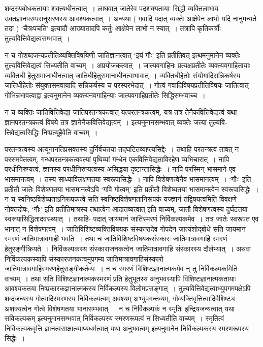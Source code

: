 {शब्दस्यबोधकतायाः शक्त्यधीनत्वात्~। लाघवात् जातेरेव पदशक्यतायाः सिद्धौ व्यक्तिलाभाय उक्तज्ञानपरम्परानुसरणस्य आवश्यकत्वात्~। अन्यथा ( गवादि पदात् व्यक्तेः आक्षेपेन लाभो यदि नानुमन्यते तदा ) ‘चैत्रःपचति’ इत्यादौ आख्यातादपि कर्तुः आक्षेपेन लाभो न स्यात्~। तत्रापि कृतिकर्त्रोः तुल्यवित्तिवेद्यत्वसम्भवात्~। 

न च गोशब्दजन्यप्रतीतिःव्यक्तिविषयिणी जातिज्ञानत्वात् ‘इयं गौः’ इति प्रतीतिवत् इत्थमनुमानेन व्यक्तेः तुल्यवित्तिवेद्यत्वं सिध्यतीति वाच्यम्~। अप्रयोजकत्वात्~।  जात्यवगाहिनः प्रत्यक्षप्रतीतेः व्यक्त्यवगाहितायाः व्यक्तिधी हेतुसमाजाधीनत्वात् जातिधीहेतुसमानाधीनत्वाभावात्~। व्यक्तिधीहेतोः संयोगादिसन्निकर्षस्य जातिधीहेतोः संयुक्तसमवायादि सन्निकर्षस्य च परस्परभेदात्~। गोत्वं गवादिविषयप्रतीतिविषयः जातित्वात् गोभिन्नभावत्वाद्वा इत्यनुमानेन व्यक्त्यनवगाहिन्याः जात्यवगाहिप्रतीतेः सिद्धिसम्भवाच्च~। 

न च व्यक्तिः जातिवित्तिवेद्या जातिपरतन्त्रकत्वात् यत्परतन्त्रकत्वम्, यत्र तत्र तेनैकवित्तिवेद्यत्वं यथा ज्ञानपरतन्त्रकत्वं विषये तत्र ज्ञानेनैकवित्तिवेद्यत्वम्~। इत्यनुमानसम्भवात् व्यक्तेः जत्या तुल्यवि- त्तिवेद्यत्वसिद्धिः निष्प्रत्यूहैवेति वाच्यम्~। 

परतन्त्रत्वस्य अत्यूनानतिप्रसक्तस्य दुर्निर्वचतया तद्घटितव्याप्त्यसिद्देः~। तथाहि परतन्त्रत्वं तावत् न परसमवेतत्वम्, गन्धपरतन्त्रकत्ववत्यां पृथिव्यां गन्धेन एकवित्तिवेद्यताविरहेण व्यभिचारात्~। नापि परधीनिरुप्यत्वं, ज्ञानस्य परधीनिरुप्यत्वस्य असिद्धया दृष्टान्तासिद्धेः~। नापि परस्मिन् भासमाने एव भासमानत्वम्~। तस्य साध्याविलक्षणतया स्वरूपासिद्धेः~। नापि विशेषणत्वेनैव भासमानत्वम्~। ‘गौः’ इति प्रतीतौ जातेः विशेषणतया भासमानत्वेऽपि ‘गवि गोत्वम्’ इति प्रतीतौ विशेष्यतया भासमानत्वेन स्वरूपासिद्धेः~। न च स्वनिष्ठविशेष्यताऽनिरूपकत्वे सति स्वनिष्ठविशेषणतानिरूपकं यज्ज्ञानं तद्विषयत्वमिति विवक्षणे नोक्तदोषः, ‘गौः’ इति प्रतीतिमात्रस्य तथात्वेन आदातव्यत्वात् इति वाच्यम्, जातौ विशेषणत्वस्य दुर्घटतया स्वरूपासिद्धितादवस्थ्यात्~। तथाहि- पदात् जायमानं जातिस्मरणं निर्विकल्पकमेव~। तत्र जातेः स्वरूपत एव भानात् न विशेषणत्वम्~। जातिविशिष्टव्यक्तिविषयक संस्कारादेव गोपदेन जात्यंशोद्बोधे सति जायमानं स्मरणं जातिमात्रावगाही भवति~। तथा च जातिविशिष्टविषयकसंस्कारः जातिमात्रावगाहि स्मरणं हेतुरङ्गीक्रियते~। निर्विकल्पकस्य संस्काराजनकत्वेन जातिमात्रावगाहि संस्कारस्य दौर्लभ्यात्~। अथवा निर्विकल्पकस्यापि संस्कारजनकत्वमुपगम्य जातिमात्रावगाहिसंस्कारो जातिमात्रावगाहिस्मरणहेतुराङ्गीकर्तव्यः~। न च स्मरणं विशिष्टज्ञानात्मकमेव न् तु निर्विकल्पकमिति वाच्यम्~। तथा सति विशिष्टज्ञानात्मकस्मरणं प्रति हेतुभूतस्य अनुभवस्यापि विशिष्टज्ञानात्मकतायाः आवश्यकतया निष्प्रकारकज्ञानात्मकस्य निर्विकल्पस्य विलोमप्रसङ्गात्~। तुल्यवित्तिवेद्यत्वाभ्युपगमपक्षेऽपि शब्दजन्यस्य गोत्वादिस्मरणस्य निर्विकल्पत्वम् अवश्यम् अभ्युपगन्तव्यम्, गोव्यक्तिवृत्तित्वादिवैशिष्ट्य अशक्यत्वेन गोत्वे विशेषणतया भानासम्भवात्~। न च निर्विकल्पकं न स्मृतिः इन्द्रियजन्यत्वात् यथा सविकल्पकम् इत्यनुमानसम्भवात् निर्विकल्पस्य स्मरणरूपत्वं न सिध्यतीति वाच्यम्~। स्मृतित्वं निर्विकल्पकवृत्ति ज्ञानत्वसाक्षात्व्याप्यधर्मत्वात् यथा अनुभवत्वम् इत्यनुमानेन निर्विकल्पकस्य स्मरणरूपस्य सिद्धेः~। 

}
